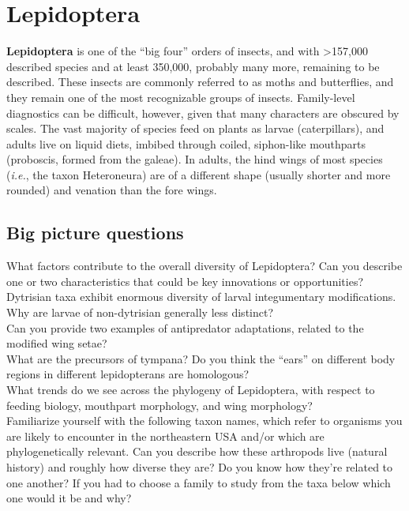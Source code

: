 \documentclass[letterpaper, 11pt]{article}
\begin{document}
\section{Lepidoptera}

\noindent{}\textbf{Lepidoptera} is one of the ``big four'' orders of insects, and with \textgreater157,000 described species and at least 350,000, probably many more, remaining to be described. These insects are commonly referred to as moths and butterflies, and they remain one of the most recognizable groups of insects. Family-level diagnostics can be difficult, however, given that many characters are obscured by scales. The vast majority of species feed on plants as larvae (caterpillars), and adults live on liquid diets, imbibed through coiled, siphon-like mouthparts (proboscis, formed from the galeae). In adults, the hind wings of most species (\textit{i.e.}, the taxon Heteroneura) are of a different shape (usually shorter and more rounded) and venation than the fore wings.

\subsection*{Big picture questions}
\noindent{}What factors contribute to the overall diversity of Lepidoptera? Can you describe one or two characteristics that could be key innovations or opportunities? \\

\noindent{}Dytrisian taxa exhibit enormous diversity of larval integumentary modifications. Why are larvae of non-dytrisian generally less distinct? \\

\noindent{}Can you provide  two examples of antipredator adaptations, related to the modified wing setae? \\

\noindent{}What are the precursors of tympana? Do you think the ``ears'' on different body regions in different lepidopterans are homologous? \\ 

\noindent{}What trends do we see across the phylogeny of Lepidoptera, with respect to feeding biology, mouthpart morphology, and wing morphology? \\

\noindent{}Familiarize yourself with the following taxon names, which refer to organisms you are likely to encounter in the northeastern USA and/or which are phylogenetically relevant. Can you describe how these arthropods live (natural history) and roughly how diverse they are? Do you know how they're related to one another? If you had to choose a family to study from the taxa below which one would it be and why?
\end{document}
